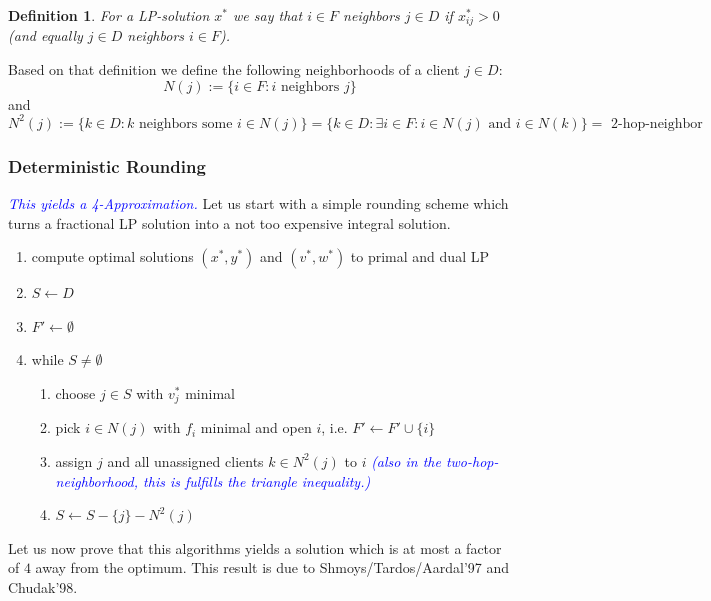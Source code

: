 \documentclass{article}
\newtheorem{definition}{Definition}
\begin{document}
\begin{definition}
For a LP-solution $x^*$ we say that $i\in F$ \emph{neighbors} $j\in D$ if $x^*_{ij}>0$ (and equally $j\in D$ \emph{neighbors} $i\in F$).
\end{definition}

Based on that definition we define the following neighborhoods of a client $j\in D$:
\[
	N(j):=\{i\in F: i\mbox{ neighbors } j\} 
\]
and
\[
	N^2(j):=\{k\in D: k\mbox{ neighbors some } i\in N(j)\} = \{k\in D: \exists i \in F: i \in N(j) \mbox{ and } i \in N(k)\} = \mbox{ 2-hop-neighbor }
\]

\subsubsection{Deterministic Rounding}
\textcolor{blue}{\emph{This yields a 4-Approximation.}}
Let us start with a simple rounding scheme which turns a fractional LP solution into a not too expensive integral solution.
\begin{enumerate}
\item compute optimal solutions $(x^*, y^*)$ and $(v^*,w^*)$ to primal and dual LP
\item $S\leftarrow D$
\item $F'\leftarrow\emptyset$
\item while $S\neq \emptyset$
	\begin{enumerate}
	\item choose $j\in S$ with $v_j^*$ minimal
	\item pick $i\in N(j)$ with $f_i$ minimal and open $i$, i.e. $F' \leftarrow F' \cup \{i\}$ 
	\item assign $j$ and all unassigned clients $k \in N^2(j)$ to $i$  \textcolor{blue}{\emph{(also in the two-hop-neighborhood, this is fulfills the triangle inequality.)}}
	\item $S\leftarrow S-\{j\}-N^2(j)$
	\end{enumerate}
\end{enumerate}

Let us now prove that this algorithms yields a solution which is at most a factor of $4$ away from the optimum. This result is due to Shmoys/Tardos/Aardal'97 and Chudak'98.
\end{document}
